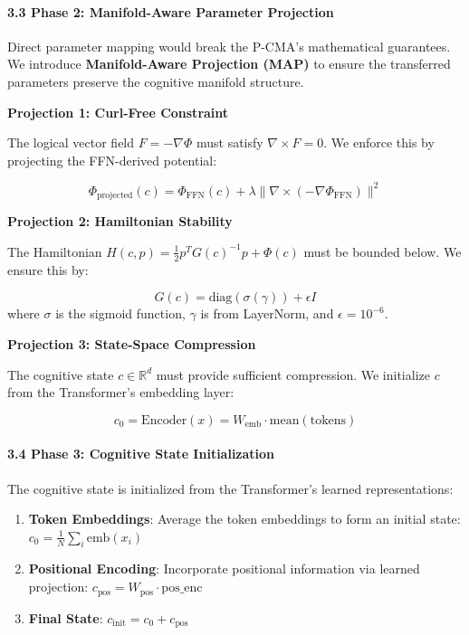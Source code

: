 \documentclass[
  11pt,
  a4paper,
]{article}
\begin{document}
\paragraph{3.3 Phase 2: Manifold-Aware Parameter
Projection}\label{phase-2-manifold-aware-parameter-projection}

Direct parameter mapping would break the P-CMA's mathematical
guarantees. We introduce \textbf{Manifold-Aware Projection (MAP)} to
ensure the transferred parameters preserve the cognitive manifold
structure.

\textbf{Projection 1: Curl-Free Constraint}

The logical vector field \(F = -\nabla\Phi\) must satisfy
\(\nabla \times F = 0\). We enforce this by projecting the FFN-derived
potential:

\[
\Phi_{\text{projected}}(c) = \Phi_{\text{FFN}}(c) + \lambda \|\nabla \times (-\nabla\Phi_{\text{FFN}})\|^2
\]

\textbf{Projection 2: Hamiltonian Stability}

The Hamiltonian \(H(c,p) = \frac{1}{2}p^T G(c)^{-1}p + \Phi(c)\) must be
bounded below. We ensure this by:

\[
G(c) = \text{diag}(\sigma(\gamma)) + \epsilon I
\] where \(\sigma\) is the sigmoid function, \(\gamma\) is from
LayerNorm, and \(\epsilon = 10^{-6}\).

\textbf{Projection 3: State-Space Compression}

The cognitive state \(c \in \mathbb{R}^d\) must provide sufficient
compression. We initialize \(c\) from the Transformer's embedding layer:

\[
c_0 = \text{Encoder}(x) = W_{\text{emb}} \cdot \text{mean}(\text{tokens})
\]

\paragraph{3.4 Phase 3: Cognitive State
Initialization}\label{phase-3-cognitive-state-initialization}

The cognitive state is initialized from the Transformer's learned
representations:

\begin{enumerate}
\def\labelenumi{\arabic{enumi}.}
\item
  \textbf{Token Embeddings}: Average the token embeddings to form an
  initial state: \(c_0 = \frac{1}{N} \sum_i \text{emb}(x_i)\)
\item
  \textbf{Positional Encoding}: Incorporate positional information via
  learned projection:
  \(c_{\text{pos}} = W_{\text{pos}} \cdot \text{pos\_enc}\)
\item
  \textbf{Final State}: \(c_{\text{init}} = c_0 + c_{\text{pos}}\)
\end{enumerate}
\end{document}
